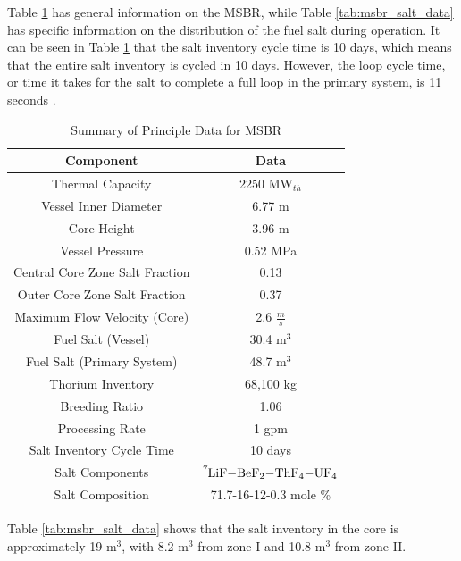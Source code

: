 Table \ref{tab:msbr_gen_data} has general information on the MSBR, while Table \ref{tab:msbr_salt_data} has specific information on the distribution of the fuel salt during operation. It can be seen in Table \ref{tab:msbr_gen_data} that the salt inventory cycle time is 10 days, which means that the entire salt inventory is cycled in 10 days. However, the loop cycle time, or time it takes for the salt to complete a full loop in the primary system, is 11 seconds \cite{robertson_conceptual_1971}.

\begin{table}[H]
\renewcommand{\arraystretch}{1.25}
\caption{Summary of Principle Data for MSBR \cite{robertson_conceptual_1971}}
\label{tab:msbr_gen_data}
\begin{center}
\begin{tabular}{ | c | c | }
 \hline
 Component & Data\\
 \hline
 \hline
 Thermal Capacity & 2250 MW$_{th}$\\
 Vessel Inner Diameter & 6.77 m\\
 Core Height & 3.96 m\\
 Vessel Pressure & 0.52 MPa\\
 Central Core Zone Salt Fraction & 0.13\\
 Outer Core Zone Salt Fraction & 0.37\\
 Maximum Flow Velocity (Core) & 2.6 $\frac{m}{s}$\\
 Fuel Salt (Vessel) & 30.4 m$^3$\\
 Fuel Salt (Primary System) & 48.7 m$^3$\\
 Thorium Inventory & 68,100 kg\\
 Breeding Ratio & 1.06\\
 Processing Rate & 1 gpm\\
 Salt Inventory Cycle Time & 10 days\\
 Salt Components & $\ce{^{7}LiF-BeF_{2}-ThF_{4}-UF_{4}} $\\
 Salt Composition & 71.7-16-12-0.3 mole \% \\
 \hline
\end{tabular}
\end{center}
\end{table}

Table \ref{tab:msbr_salt_data} shows that the salt inventory in the core is approximately 19 m$^3$, with 8.2 m$^3$ from zone I and 10.8 m$^3$ from zone II.


